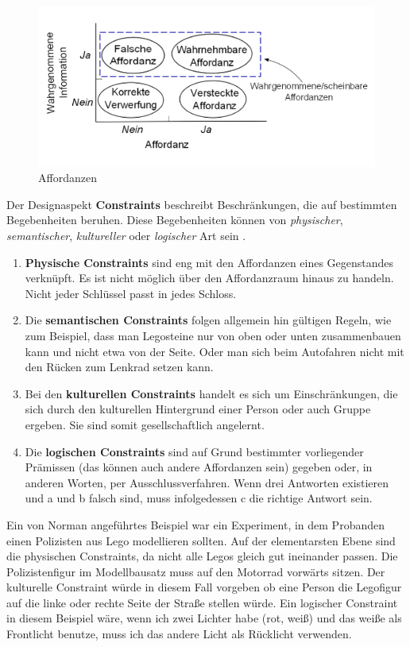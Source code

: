 \documentclass[parskip,headsepline, headtopline, %
footsepline, oneside, 12pt, headings=small]{scrreprt}
\begin{document}
\begin{figure}
\center
\includegraphics[width=.7\textwidth]{images/figure2_affordances.png}
\caption{Affordanzen}
\label{fig:affordanz}
\end{figure}

Der Designaspekt \textbf{Constraints} beschreibt Beschränkungen, die auf bestimmten Begebenheiten beruhen. Diese Begebenheiten können von \textit{physischer}, \textit{semantischer}, \textit{kultureller} oder \textit{logischer} Art sein \cite[Vgl. S.82ff]{don}.

\begin{enumerate}
\item \textbf{Physische Constraints} sind eng mit den Affordanzen eines Gegenstandes verknüpft. Es ist nicht möglich über den Affordanzraum hinaus zu handeln. Nicht jeder Schlüssel passt in jedes Schloss.
\item Die \textbf{semantischen Constraints} folgen allgemein hin gültigen Regeln, wie zum Beispiel, dass man Legosteine nur von oben oder unten zusammenbauen kann und nicht etwa von der Seite. Oder man sich beim Autofahren  nicht mit den Rücken zum Lenkrad setzen kann.
\item Bei den \textbf{kulturellen Constraints} handelt es sich um Einschränkungen, die sich durch den kulturellen Hintergrund einer Person oder auch Gruppe ergeben. Sie sind somit gesellschaftlich angelernt.
\item Die \textbf{logischen Constraints} sind auf Grund bestimmter vorliegender Prämissen (das können auch andere Affordanzen sein) gegeben oder, in anderen Worten, per \glqq Ausschlussverfahren\grqq. Wenn drei Antworten existieren und a und b falsch sind, muss infolgedessen c die richtige Antwort sein. 
\end{enumerate}


Ein von Norman angeführtes Beispiel war ein Experiment, in dem Probanden einen Polizisten aus  Lego modellieren sollten.
Auf der elementarsten Ebene sind die physischen Constraints, da nicht alle Legos gleich gut ineinander passen. 
Die  Polizistenfigur im Modellbausatz muss auf den Motorrad vorwärts sitzen. Der kulturelle Constraint würde in diesem Fall vorgeben ob eine Person die Legofigur auf die linke oder rechte Seite der Straße stellen würde.  Ein logischer Constraint in diesem Beispiel wäre, wenn ich zwei Lichter habe (rot, weiß) und das weiße als Frontlicht benutze, muss ich das andere Licht als Rücklicht verwenden. 
\end{document}
